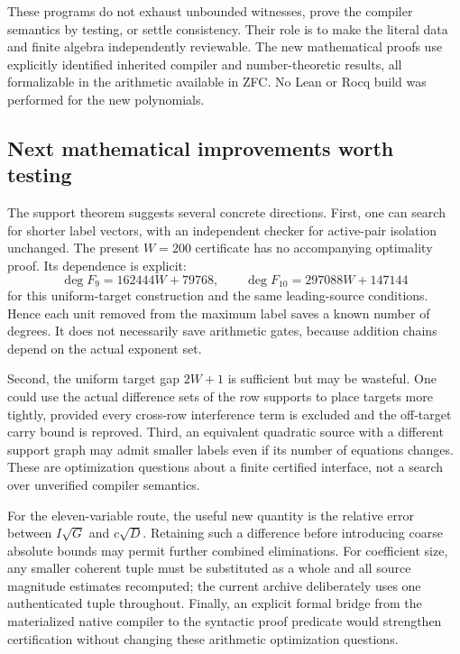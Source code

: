These programs do not exhaust unbounded witnesses, prove the compiler
semantics by testing, or settle consistency. Their role is to make the
literal data and finite algebra independently reviewable. The new
mathematical proofs use explicitly identified inherited compiler and
number-theoretic results, all formalizable in the arithmetic available
in ZFC. No Lean or Rocq build was performed for the new polynomials.

\subsection{Next mathematical improvements worth testing}
The support theorem suggests several concrete directions.
First, one can search for shorter label vectors, with an independent
checker for active-pair isolation unchanged. The present $W=200$
certificate has no accompanying optimality proof. Its dependence is
explicit:
\[
 \deg F_9=162444W+79768,\qquad
 \deg F_{10}=297088W+147144
\]
for this uniform-target construction and the same leading-source
conditions. Hence each unit removed from the maximum label saves a
known number of degrees. It does not necessarily save arithmetic gates,
because addition chains depend on the actual exponent set.

Second, the uniform target gap $2W+1$ is sufficient but may be wasteful.
One could use the actual difference sets of the row supports to place
targets more tightly, provided every cross-row interference term is
excluded and the off-target carry bound is reproved. Third, an equivalent
quadratic source with a different support graph may admit smaller labels
even if its number of equations changes. These are optimization questions
about a finite certified interface, not a search over unverified compiler
semantics.

For the eleven-variable route, the useful new quantity is the relative
error between $I\sqrt{G}$ and $c\sqrt{D}$. Retaining such a difference
before introducing coarse absolute bounds may permit further combined
eliminations. For coefficient size, any smaller coherent tuple must be
substituted as a whole and all source magnitude estimates recomputed;
the current archive deliberately uses one authenticated tuple throughout.
Finally, an explicit formal bridge from the materialized native compiler
to the syntactic proof predicate would strengthen certification without
changing these arithmetic optimization questions.
